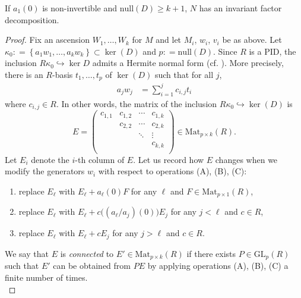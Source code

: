 \documentclass[ALCO, Unicode]{cedram}
\newcommand{\GL}{\mathrm{GL}}
\begin{document}
 
 \begin{theorem}   \label{mainabsteo1}    If $ a_{1}(0) $ is non-invertible  and  $ \mathrm{null}(D) \geq   k + 1 $,  
$ N $ has an invariant factor decomposition. 
\end{theorem}  
\begin{proof}  Fix an ascension $ W_{1}, \ldots, W_{k} $ for $ M $ and let $ M_{i} $, $ w_{i} $, $ v_{i} $ be as above. Let $ \kappa_{0} :  = \left \{ a_{1}w_{1} , \ldots, a_{k} w_{k} \right \}   \subset \ker(D)   $     
and $ p :  = \mathrm{null}(D) $.  Since $ R $ is a PID, the inclusion $ R \kappa_{0}  \hookrightarrow \ker D $ admits a Hermite normal form (cf. \cite[\S 3.2]{Zassenhaus}).  More precisely, there is an $ R $-basis $  t_{1}, \ldots, t_{p} $ of $ \ker ( D  ) $  such  that  for all $ j $,    
\begin{align}  \label{hermiteeq}  a_{j}  w_{j}     & =  \sum_{i = 1 } ^ {  j  }   c_{i,j} t_{i}    %
\end{align}
where   $     c_{i,j} \in R $. In other words, the matrix of the inclusion $ R \kappa _{0}  \hookrightarrow \ker (D) $ is
\[E =   \left (  \begin{matrix} c_{1,1} & c_{1,2} & \cdots & c_{1,k}   \\
& c_{2,2} & \cdots & c_{2,k} \\
 &  &  \ddots & \vdots  \\
 &  & & c_{k,k} \\
 & 
\end{matrix}  \right   )  \in  \mathrm{Mat}_{p \times k } (  R    ).\]
Let $ E_{i} $ denote the $ i $-th column of $ E $. Let us record how $ E $ changes when we modify the generators $ w_{i}   $ with respect to operations (A), (B), (C): 
\begin{enumerate} 
\item [(A)] replace $E_{\ell}  $ with $ E_{\ell} + a_{\ell} (0) F $  for any $ \ell $ and $ F  \in \mathrm{Mat}_{p \times 1}(R) $,    
\item[(B)]   replace $ E_{\ell} $ with $ E_{\ell} + c \big((a_{\ell}/a_{j})(0)\big) E_{j}  $  for any $ j   <  \ell $ and $ c \in  R $,    
\item [(C)] replace $ E_{\ell} $ with $ E_{\ell} + c E_{j} $ for any $  j    >  \ell  $ and $ c \in R $.        
\end{enumerate} 
We say that $ E $ is \emph{connected} to $ E ' \in \mathrm{Mat}_{p \times k}(R) $ if there exists  $ P \in \GL_{p}(R) $ such that $ E' $ can be obtained from $ PE $ by applying operations (A), (B), (C) a finite number of times. \\


\end{proof}
\end{document}
